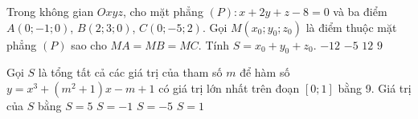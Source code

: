 \begin{ex}%
	Trong không gian $Oxyz$, cho mặt phẳng $(P)\colon x+2y+z-8=0$ và ba điểm $A(0;-1;0)$, $B(2;3;0)$, $C(0;-5;2)$. Gọi $M(x_0;y_0;z_0)$ là điểm thuộc mặt phẳng $(P)$ sao cho $MA=MB=MC$. Tính $S=x_0+y_0+z_0$.
	\choice
	{$-12$}
	{$-5$}
	{$12$}
	{\True $9$}
\end{ex}

\begin{ex}%
	Gọi $S$ là tổng tất cả các giá trị của tham số $m$ để hàm số $y=x^3+(m^2+1)x-m+1$ có giá trị lớn nhất trên đoạn $[0;1]$ bằng 9. Giá trị của $S$ bằng
	\choice
	{$S=5$}
	{$S=-1$}
	{$S=-5$}
	{\True $S=1$}
\end{ex}

